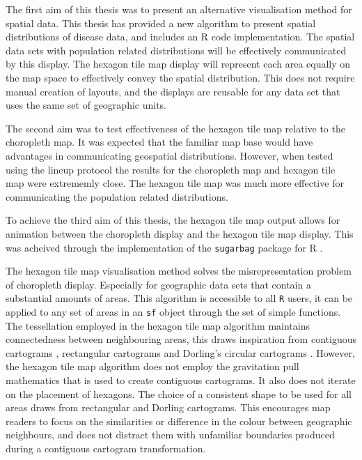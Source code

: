 \documentclass{monashthesis}
\begin{document}
The first aim of this thesis was to present an alternative visualisation method for spatial data. This thesis has provided a new algorithm to present spatial distributions of disease data, and includes an R code \autocite{R} implementation. The spatial data sets with population related distributions will be effectively communicated by this display. The hexagon tile map display will represent each area equally on the map space to effectively convey the spatial distribution. This does not require manual creation of layouts, and the displays are reusable for any data set that uses the same set of geographic units.

The second aim was to test effectiveness of the hexagon tile map relative to the choropleth map. It was expected that the familiar map base would have advantages in communicating geospatial distributions. However, when tested using the lineup protocol the results for the choropleth map and hexagon tile map were extrememly close. The hexagon tile map was much more effective for communicating the population related distributions.

To achieve the third aim of this thesis, the hexagon tile map output allows for animation between the choropleth display and the hexagon tile map display. This was acheived through the implementation of the \texttt{sugarbag} \autocite{sugarbag} package for R \autocite{R}.

The hexagon tile map visualisation method solves the misrepresentation problem of choropleth display. Especially for geographic data sets that contain a substantial amounts of areas. This algorithm is accessible to all \texttt{R} users, it can be applied to any set of areas in an \texttt{sf} \autocite{sf} object through the set of simple functions.
The tessellation employed in the hexagon tile map algorithm maintains connectedness between neighbouring areas, this draws inspiration from contiguous cartograms \autocite{ACA}, rectangular cartograms \autocite{RSCW} and Dorling's circular cartograms \autocite{ACTUC}. However, the hexagon tile map algorithm does not employ the gravitation pull mathematics that is used to create contiguous cartograms. It also does not iterate on the placement of hexagons. The choice of a consistent shape to be used for all areas draws from rectangular and Dorling cartograms. This encourages map readers to focus on the similarities or difference in the colour between geographic neighbours, and does not distract them with unfamiliar boundaries produced during a contiguous cartogram transformation.
\end{document}
